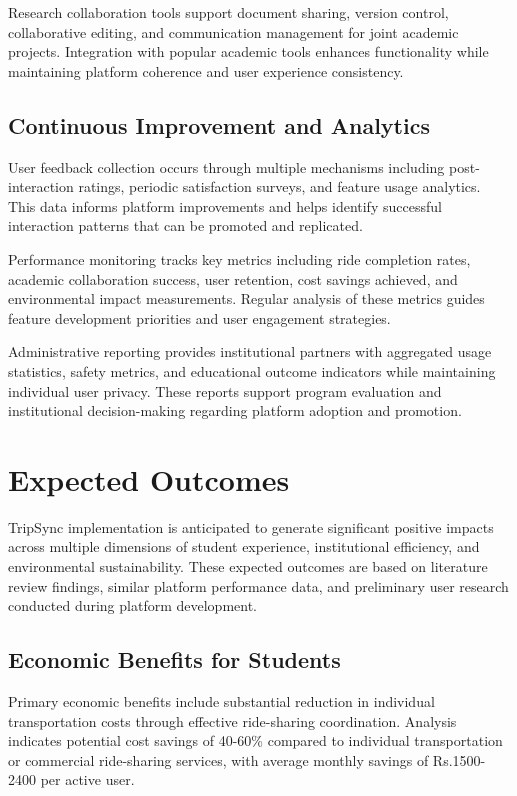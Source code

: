 \documentclass[conference]{IEEEtran}
\begin{document}
Research collaboration tools support document sharing, version control, collaborative editing, and communication management for joint academic projects. Integration with popular academic tools enhances functionality while maintaining platform coherence and user experience consistency.

\subsection{Continuous Improvement and Analytics}

User feedback collection occurs through multiple mechanisms including post-interaction ratings, periodic satisfaction surveys, and feature usage analytics. This data informs platform improvements and helps identify successful interaction patterns that can be promoted and replicated.

Performance monitoring tracks key metrics including ride completion rates, academic collaboration success, user retention, cost savings achieved, and environmental impact measurements. Regular analysis of these metrics guides feature development priorities and user engagement strategies.

Administrative reporting provides institutional partners with aggregated usage statistics, safety metrics, and educational outcome indicators while maintaining individual user privacy. These reports support program evaluation and institutional decision-making regarding platform adoption and promotion.

\section{Expected Outcomes}

TripSync implementation is anticipated to generate significant positive impacts across multiple dimensions of student experience, institutional efficiency, and environmental sustainability. These expected outcomes are based on literature review findings, similar platform performance data, and preliminary user research conducted during platform development.

\subsection{Economic Benefits for Students}

Primary economic benefits include substantial reduction in individual transportation costs through effective ride-sharing coordination. Analysis indicates potential cost savings of 40-60\% compared to individual transportation or commercial ride-sharing services, with average monthly savings of Rs.1500-2400 per active user.
\end{document}
